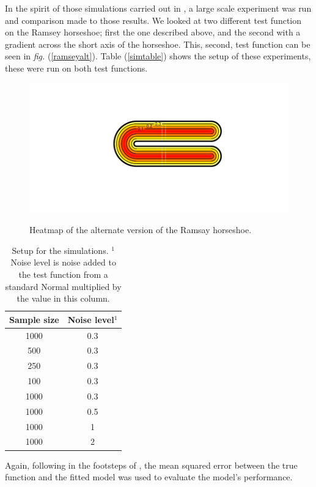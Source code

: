 \documentclass[a4paper,10pt]{amsart}
\newcommand{\fig}[1]{\emph{fig.} (\ref{#1})}
\begin{document}
In the spirit of those simulations carried out in \cite{soap}, a large scale experiment was run and comparison made to those results. We looked at two different test function on the Ramsey horseshoe; first the one described above, and the second with a gradient across the short axis of the horseshoe. This, second, test function can be seen in \fig{ramseyalt}. Table (\ref{simtable}) shows the setup of these experiments, these were run on both test functions.


\begin{figure}
\centering
\includegraphics[trim=0.5in 1in 0in 1in]{figs/altramsayhorseshoe.pdf} \\
\caption{Heatmap of the alternate version of the Ramsay horseshoe.}
\label{altramsayshorseshoe}
\end{figure}

\begin{table}[ht]
\begin{tabular}{c c}\\
Sample size & Noise level$^{1}$ \\
\hline
\hline
1000 & 0.3 \\
500 & 0.3 \\
250 & 0.3 \\
100 & 0.3 \\
1000 & 0.3 \\
1000 & 0.5 \\
1000 & 1 \\
1000 & 2 \\
\end{tabular}
\caption{Setup for the simulations. $^{1}$Noise level is noise added to the test function from a standard Normal multiplied by the value in this column. }
\end{table}

Again, following in the footsteps of \cite{soap}, the mean squared error between the true function and the fitted model was used to evaluate the model's performance.
\end{document}
